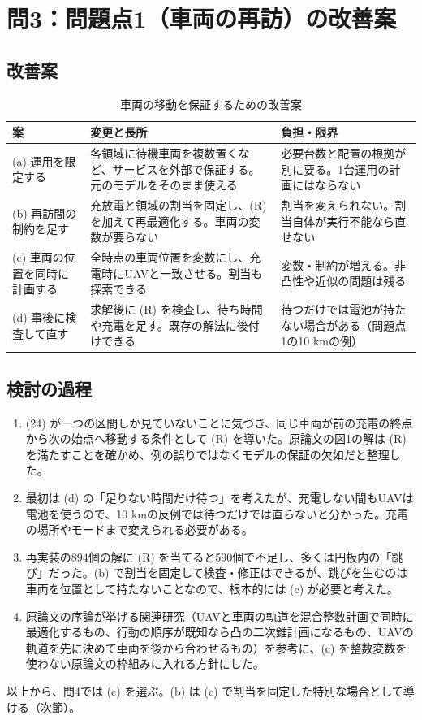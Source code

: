 \documentclass[uplatex,dvipdfmx,a4paper,11pt,jafont=haranoaji]{bxjsarticle}
\newcommand{\answerpart}[1]{\par\Needspace{6\baselineskip}\subsection*{#1}}
\begin{document}
\FloatBarrier
\section{問3：問題点1（車両の再訪）の改善案}

\answerpart{改善案}
\begin{table}[H]
  \centering
  \caption{車両の移動を保証するための改善案}
  \label{tab:options}
  \begin{tabular}{p{}p{}p{}}
    \toprule
    案 & 変更と長所 & 負担・限界 \\
    \midrule
    (a) 運用を限定する & 各領域に待機車両を複数置くなど、サービスを外部で保証する。元のモデルをそのまま使える & 必要台数と配置の根拠が別に要る。1台運用の計画にはならない \\
    (b) 再訪間の制約を足す & 充放電と領域の割当を固定し、(R) を加えて再最適化する。車両の変数が要らない & 割当を変えられない。割当自体が実行不能なら直せない \\
    (c) 車両の位置を同時に計画する & 全時点の車両位置を変数にし、充電時にUAVと一致させる。割当も探索できる & 変数・制約が増える。非凸性や近似の問題は残る \\
    (d) 事後に検査して直す & 求解後に (R) を検査し、待ち時間や充電を足す。既存の解法に後付けできる & 待つだけでは電池が持たない場合がある（問題点1の10 kmの例） \\
    \bottomrule
  \end{tabular}
\end{table}

\answerpart{検討の過程}
\begin{enumerate}
  \item (24) が一つの区間しか見ていないことに気づき、同じ車両が前の充電の終点から次の始点へ移動する条件として (R) を導いた。原論文の図1の解は (R) を満たすことを確かめ、例の誤りではなくモデルの保証の欠如だと整理した。
  \item 最初は (d) の「足りない時間だけ待つ」を考えたが、充電しない間もUAVは電池を使うので、10 kmの反例では待つだけでは直らないと分かった。充電の場所やモードまで変えられる必要がある。
  \item 再実装の894個の解に (R) を当てると590個で不足し、多くは円板内の「跳び」だった。(b) で割当を固定して検査・修正はできるが、跳びを生むのは車両を位置として持たないことなので、根本的には (c) が必要と考えた。
  \item 原論文の序論が挙げる関連研究（UAVと車両の軌道を混合整数計画で同時に最適化するもの、行動の順序が既知なら凸の二次錐計画になるもの、UAVの軌道を先に決めて車両を後から合わせるもの）を参考に、(c) を整数変数を使わない原論文の枠組みに入れる方針にした。
\end{enumerate}
以上から、問4では (c) を選ぶ。(b) は (c) で割当を固定した特別な場合として導ける（次節）。
\end{document}
